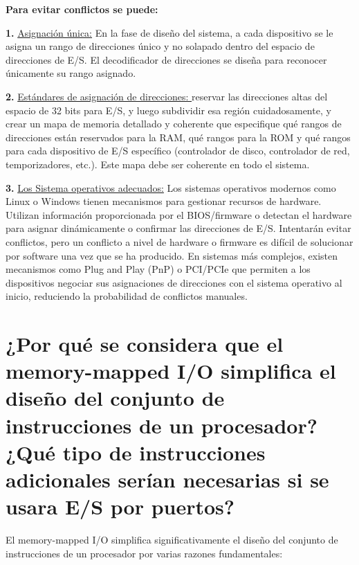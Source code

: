 \documentclass{article}
\begin{document}
\quad

\textbf{Para evitar conflictos se puede:}

\quad

\textbf{1.   } \underline{Asignación única:}  {En la fase de diseño del sistema, a cada dispositivo se le asigna un rango de direcciones único y no solapado dentro del espacio de direcciones de E/S. El decodificador de direcciones se diseña para reconocer únicamente su rango asignado.}

\quad

\textbf{2.   } \underline{Estándares de asignación de direcciones: }  {reservar las direcciones altas del espacio de 32 bits para E/S, y luego subdividir esa región cuidadosamente, y crear un mapa de memoria detallado y coherente que especifique qué rangos de direcciones están reservados para la RAM, qué rangos para la ROM y qué rangos para cada dispositivo de E/S específico (controlador de disco, controlador de red, temporizadores, etc.). Este mapa debe ser coherente en todo el sistema.}

\quad

\textbf{3.   } \underline{Los Sistema operativos adecuados:}  {Los sistemas operativos modernos como Linux o Windows tienen mecanismos para gestionar recursos de hardware. Utilizan información proporcionada por el BIOS/firmware o detectan el hardware para asignar dinámicamente o confirmar las direcciones de E/S. Intentarán evitar conflictos, pero un conflicto a nivel de hardware o firmware es difícil de solucionar por software una vez que se ha producido. En sistemas más complejos, existen mecanismos como Plug and Play (PnP) o PCI/PCIe que permiten a los dispositivos negociar sus asignaciones de direcciones con el sistema operativo al inicio, reduciendo la probabilidad de conflictos manuales.}

\quad
\newpage






\section{¿Por qué se considera que el memory-mapped I/O simplifica el diseño del conjunto de instrucciones de un procesador? ¿Qué tipo de instrucciones adicionales serían necesarias si se usara E/S por puertos?}

\quad

{El memory-mapped I/O simplifica significativamente el diseño del conjunto de instrucciones de un procesador por varias razones fundamentales:}
\end{document}
